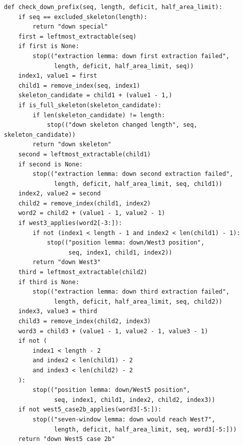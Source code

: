 \documentclass[11pt]{article}
\theoremstyle{plain}
\theoremstyle{definition}
\theoremstyle{remark}
\begin{document}
\begin{lstlisting}
def check_down_prefix(seq, length, deficit, half_area_limit):
    if seq == excluded_skeleton(length):
        return "down special"
    first = leftmost_extractable(seq)
    if first is None:
        stop(("extraction lemma: down first extraction failed",
              length, deficit, half_area_limit, seq))
    index1, value1 = first
    child1 = remove_index(seq, index1)
    skeleton_candidate = child1 + (value1 - 1,)
    if is_full_skeleton(skeleton_candidate):
        if len(skeleton_candidate) != length:
            stop(("down skeleton changed length", seq, skeleton_candidate))
        return "down skeleton"
    second = leftmost_extractable(child1)
    if second is None:
        stop(("extraction lemma: down second extraction failed",
              length, deficit, half_area_limit, seq, child1))
    index2, value2 = second
    child2 = remove_index(child1, index2)
    word2 = child2 + (value1 - 1, value2 - 1)
    if west3_applies(word2[-3:]):
        if not (index1 < length - 1 and index2 < len(child1) - 1):
            stop(("position lemma: down/West3 position",
                  seq, index1, child1, index2))
        return "down West3"
    third = leftmost_extractable(child2)
    if third is None:
        stop(("extraction lemma: down third extraction failed",
              length, deficit, half_area_limit, seq, child2))
    index3, value3 = third
    child3 = remove_index(child2, index3)
    word3 = child3 + (value1 - 1, value2 - 1, value3 - 1)
    if not (
        index1 < length - 2
        and index2 < len(child1) - 2
        and index3 < len(child2) - 2
    ):
        stop(("position lemma: down/West5 position",
              seq, index1, child1, index2, child2, index3))
    if not west5_case2b_applies(word3[-5:]):
        stop(("seven-window lemma: down would reach West7",
              length, deficit, half_area_limit, seq, word3[-5:]))
    return "down West5 case 2b"


\end{lstlisting}
\end{document}
